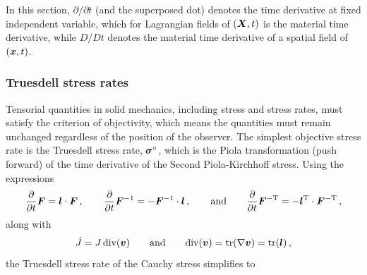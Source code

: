 \documentclass[10pt,letterpaper,oneside]{report}
\newcommand{\ten}[1]{\mbox{\boldmath $#1$}{}}
\newcommand{\scas}[1]{\mbox{{\scriptsize{${\rm{#1}}$}}}{}}
\begin{document}
In this section, $\partial / \partial t$ (and the superposed dot) denotes the time derivative at fixed independent variable, which for Lagrangian fields of $(\ten{X}, t)$ is the material time derivative, while $D/Dt$ denotes the material time derivative of a spatial field of $(\ten{x}, t)$.

\subsubsection{Truesdell stress rates}
Tensorial quantities in solid mechanics, including stress and stress rates, must satisfy the criterion of objectivity, which means the quantities must remain unchanged regardless of the position of the observer.  The simplest objective stress rate is the Truesdell stress rate, $\ten{\sigma}^{\circ}$, which is the Piola transformation (push forward) of the time derivative of the Second Piola-Kirchhoff stress.  Using the expressions 
\begin{equation}
\frac{\partial }{\partial t} \ten{F} = \ten{l} \cdot \ten{F} \, , 
\qquad  
\frac{\partial }{\partial t} \ten{F}^{-1} = - \ten{F}^{-1} \cdot \ten{l} \, , 
\qquad \text{and} \qquad
\frac{\partial }{\partial t} \ten{F}^{-\scas{T}} = - \ten{l}^{\scas{T}} \cdot \ten{F}^{-\scas{T}} \, , 
\end{equation}
along with
\begin{equation}
\dot{J} = J \, \text{div} (\ten{v}) 
\qquad \text{and} \qquad 
\text{div} (\ten{v}) = \text{tr} (\nabla \ten{v} ) = \text{tr} (\ten{l}) \, , 
\end{equation}
the Truesdell stress rate of the Cauchy stress simplifies to
\end{document}
